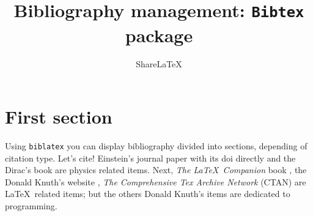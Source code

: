 \documentclass{article}
\title{Bibliography management: \texttt{Bibtex} package}
\author{Share\LaTeX}
\date{ }
\begin{document}
\maketitle

\tableofcontents

\section{First section}

Using \texttt{biblatex} you can display bibliography divided into sections, depending of citation type. 
Let's cite! Einstein's journal paper with its doi directly \cite{10.1002/andp.19053221004} and the Dirac's book \cite{dirac} are physics related items. 
Next, \textit{The \LaTeX\ Companion} book \cite{latexcompanion}, the Donald Knuth's website \cite{knuthwebsite}, \textit{The Comprehensive Tex Archive Network} (CTAN) \cite{ctan} are \LaTeX\ related items; but the others Donald Knuth's items \cite{knuth-fa,knuth-acp} are dedicated to programming. 

\medskip





\end{document}
